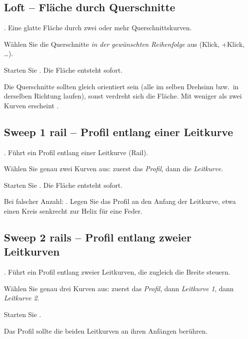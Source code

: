 \subsection{Loft -- Fläche durch Querschnitte}\label{sec:cmd-loft}
. Eine glatte Fläche durch zwei oder mehr Querschnittskurven.
\begin{schritte}
\item Wählen Sie die Querschnitte \emph{in der gewünschten Reihenfolge} aus (Klick,
  +Klick, \ldots).
\item Starten Sie . Die Fläche entsteht sofort.
\end{schritte}
Die Querschnitte sollten gleich orientiert sein (alle im selben Drehsinn bzw.\ in derselben
Richtung laufen), sonst verdreht sich die Fläche. Mit weniger als zwei Kurven erscheint
.

\subsection{Sweep 1 rail -- Profil entlang einer Leitkurve}\label{sec:cmd-sweep1}
. Führt ein Profil entlang einer Leitkurve (Rail).
\begin{schritte}
\item Wählen Sie genau zwei Kurven aus: zuerst das \emph{Profil}, dann die \emph{Leitkurve}.
\item Starten Sie . Die Fläche entsteht sofort.
\end{schritte}
Bei falscher Anzahl: . Legen Sie das
Profil an den Anfang der Leitkurve, etwa einen Kreis senkrecht zur Helix für eine Feder.

\subsection{Sweep 2 rails -- Profil entlang zweier Leitkurven}\label{sec:cmd-sweep2}
. Führt ein Profil entlang zweier Leitkurven, die zugleich die Breite steuern.
\begin{schritte}
\item Wählen Sie genau drei Kurven aus: zuerst das \emph{Profil}, dann \emph{Leitkurve 1}, dann
  \emph{Leitkurve 2}.
\item Starten Sie .
\end{schritte}
Das Profil sollte die beiden Leitkurven an ihren Anfängen berühren.


